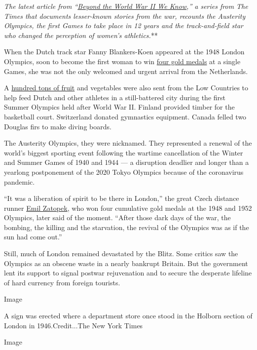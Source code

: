 \emph{\emph{\emph{The latest article from
``}\href{https://www.nytimes.com/spotlight/beyond-wwii}{\emph{Beyond the
World War II We Know}}},'' a series from The Times that documents
lesser-known stories from the war, recounts the Austerity Olympics, the
first Games to take place in 12 years and the track-and-field star who
changed the perception of women's athletics.}**

When the Dutch track star Fanny Blankers-Koen appeared at the 1948
London Olympics, soon to become the first woman to win
\href{https://www.youtube.com/watch?v=_Y_G0H-b3QE}{four gold medals} at
a single Games, she was not the only welcomed and urgent arrival from
the Netherlands.

A
\href{https://www.olympic.org/news/london-1948-only-two-years-to-prepare-and-huge-challenges}{hundred
tons of fruit} and vegetables were also sent from the Low Countries to
help feed Dutch and other athletes in a still-battered city during the
first Summer Olympics held after World War II. Finland provided timber
for the basketball court. Switzerland donated gymnastics equipment.
Canada felled two Douglas firs to make diving boards.

The Austerity Olympics, they were nicknamed. They represented a renewal
of the world's biggest sporting event following the wartime cancellation
of the Winter and Summer Games of 1940 and 1944 --- a disruption
deadlier and longer than a yearlong postponement of the 2020 Tokyo
Olympics because of the coronavirus pandemic.

``It was a liberation of spirit to be there in London,'' the great Czech
distance runner
\href{https://www.lrb.co.uk/the-paper/v38/n19/jon-day/hang-up-your-running-shoes}{Emil
Zatopek}, who won four cumulative gold medals at the 1948 and 1952
Olympics, later said of the moment. ``After those dark days of the war,
the bombing, the killing and the starvation, the revival of the Olympics
was as if the sun had come out.''

Still, much of London remained devastated by the Blitz. Some critics saw
the Olympics as an obscene waste in a nearly bankrupt Britain. But the
government lent its support to signal postwar rejuvenation and to secure
the desperate lifeline of hard currency from foreign tourists.

Image

A sign was erected where a department store once stood in the Holborn
section of London in 1946.Credit...The New York Times

Image

